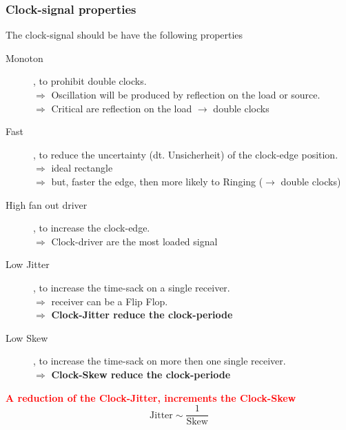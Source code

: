 \subsubsection{Clock-signal properties}
The clock-signal should be have the following properties

\begin{description}
	\item[Monoton], to prohibit double clocks. \\
		$\Rightarrow$ Oscillation will be produced by reflection on the load or source. \\
		$\Rightarrow$ Critical are reflection on the load $\rightarrow$ double clocks
		
	\item[Fast], to reduce the uncertainty (dt. Unsicherheit) of the clock-edge position. \\
		$\Rightarrow$ ideal rectangle \\
		$\Rightarrow$ but, faster the edge, then more likely to Ringing ($\rightarrow$ double clocks) 
	
	\item[High fan out driver], to increase the clock-edge. \\
		$\Rightarrow$ Clock-driver are the most loaded signal
		
	\item[Low Jitter], to increase the time-sack on a single receiver. \\
	    $\Rightarrow$ receiver can be a Flip Flop. \\
		$\Rightarrow$ \textbf{Clock-Jitter reduce the clock-periode}
		
	\item[Low Skew], to increase the time-sack on more then one single receiver. \\
		$\Rightarrow$ \textbf{Clock-Skew reduce the clock-periode}
\end{description}

\textbf{\textcolor{red}{A reduction of the Clock-Jitter, increments the Clock-Skew}}
\begin{equation*}
	\boxed{\text{Jitter} \sim \frac{1}{\text{Skew}}}
\end{equation*} 

